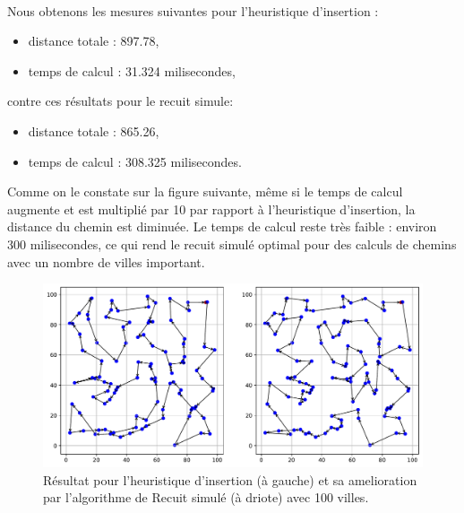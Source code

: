 \documentclass[a4paper,11pt,fleqn]{article}
\begin{document}
\paragraph{}
Nous obtenons les mesures suivantes pour l'heuristique d'insertion : 
\begin{itemize}
    \item distance totale : 897.78,
    \item temps de calcul : 31.324 milisecondes,
\end{itemize} 
contre ces résultats pour le recuit simule:
\begin{itemize}
    \item distance totale : 865.26,
    \item temps de calcul : 308.325 milisecondes.
\end{itemize}
Comme on le constate sur la figure suivante, même si le temps de calcul augmente et est multiplié par 10 par rapport à l'heuristique d'insertion, la distance du chemin est diminuée. 
Le temps de calcul reste très faible : environ 300 milisecondes, ce qui rend le recuit simulé optimal pour des calculs de chemins avec un nombre de villes important.
\begin{figure}[H]
    \centering
    \includegraphics[width=\textwidth]{images/recuit_simule.pdf}
    \caption{Résultat pour l'heuristique d'insertion (à gauche) et sa amelioration par l'algorithme de Recuit simulé (à driote) avec 100 villes.}
    \label{fig:recuit}
\end{figure}
\end{document}
